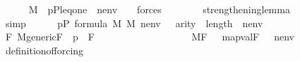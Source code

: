 \begin{isabellebody}
\ \ \ \ \isamarkupfalse%
\ {\isachardoublequoteopen}M{\isacharcomma}{\kern0pt}\ \ {\isacharbrackleft}{\kern0pt}p{\isacharcomma}{\kern0pt}P{\isacharcomma}{\kern0pt}leq{\isacharcomma}{\kern0pt}one{\isacharcomma}{\kern0pt}{\isasymtheta}{\isacharbrackright}{\kern0pt}\ {\isacharat}{\kern0pt}\ nenv\ {\isacharat}{\kern0pt}\ {\isacharbrackleft}{\kern0pt}{\isasympi}{\isacharbrackright}{\kern0pt}\ {\isasymTurnstile}\ forces{\isacharparenleft}{\kern0pt}{\isacharquery}{\kern0pt}{\isasymchi}{\isacharparenright}{\kern0pt}{\isachardoublequoteclose}\isanewline
\ \ \ \ \ \ \isamarkupfalse%
\ strengthening{\isacharunderscore}{\kern0pt}lemma\ \isanewline
\ \ \ \ \ \ \isamarkupfalse%
\ simp\isanewline
\ \ \ \ \isamarkupfalse%
\ {\isacartoucheopen}p{\isasymin}P{\isacartoucheclose}\ {\isacartoucheopen}{\isasymphi}{\isasymin}formula{\isacartoucheclose}\ {\isacartoucheopen}{\isasymtheta}{\isasymin}M{\isacartoucheclose}\ {\isacartoucheopen}{\isasympi}{\isasymin}M{\isacartoucheclose}\ {\isacartoucheopen}nenv\ {\isasymin}\ {\isacharunderscore}{\kern0pt}{\isacartoucheclose}\ {\isacartoucheopen}arity{\isacharparenleft}{\kern0pt}{\isacharquery}{\kern0pt}{\isasymchi}{\isacharparenright}{\kern0pt}\ {\isasymle}\ length{\isacharparenleft}{\kern0pt}{\isacharbrackleft}{\kern0pt}{\isasymtheta}{\isacharbrackright}{\kern0pt}\ {\isacharat}{\kern0pt}\ nenv\ {\isacharat}{\kern0pt}\ {\isacharbrackleft}{\kern0pt}{\isasympi}{\isacharbrackright}{\kern0pt}{\isacharparenright}{\kern0pt}{\isacartoucheclose}\isanewline
\ \ \ \ \isamarkupfalse%
\ {\isachardoublequoteopen}{\isasymforall}F{\isachardot}{\kern0pt}\ M{\isacharunderscore}{\kern0pt}generic{\isacharparenleft}{\kern0pt}F{\isacharparenright}{\kern0pt}\ {\isasymand}\ p\ {\isasymin}\ F\ {\isasymlongrightarrow}\ \isanewline
\ \ \ \ \ \ \ \ \ \ \ \ \ \ \ \ \ M{\isacharbrackleft}{\kern0pt}F{\isacharbrackright}{\kern0pt}{\isacharcomma}{\kern0pt}\ \ \ map{\isacharparenleft}{\kern0pt}val{\isacharparenleft}{\kern0pt}F{\isacharparenright}{\kern0pt}{\isacharcomma}{\kern0pt}\ {\isacharbrackleft}{\kern0pt}{\isasymtheta}{\isacharbrackright}{\kern0pt}\ {\isacharat}{\kern0pt}\ nenv\ {\isacharat}{\kern0pt}{\isacharbrackleft}{\kern0pt}{\isasympi}{\isacharbrackright}{\kern0pt}{\isacharparenright}{\kern0pt}\ {\isasymTurnstile}\ \ {\isacharquery}{\kern0pt}{\isasymchi}{\isachardoublequoteclose}\isanewline
\ \ \ \ \ \ \isamarkupfalse%
\ definition{\isacharunderscore}{\kern0pt}of{\isacharunderscore}{\kern0pt}forcing\isanewline
\ \ \ \ \ \ \isamarkupfalse%

\end{isabellebody}
